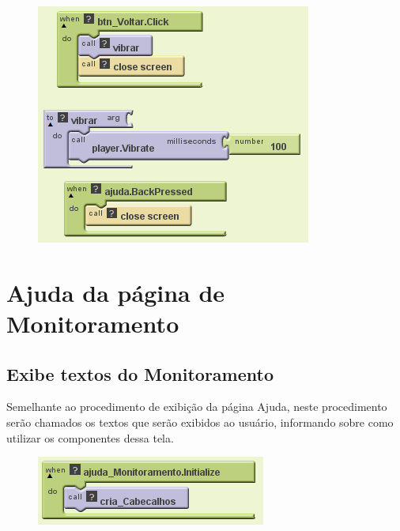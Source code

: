 \documentclass[portugues, brazil, a4paper,12pt]{article}
\begin{document}
\begin{figure}[H]
	\centering
	\includegraphics[scale=.8]{img/ajuda/saida.png}
	
\end{figure}




\newpage
\section{Ajuda da página de Monitoramento}
\subsection{Exibe textos do Monitoramento}
Semelhante ao procedimento de exibição da página Ajuda, neste procedimento serão chamados os textos que serão exibidos ao usuário, informando sobre como utilizar os componentes dessa tela.

\begin{figure}[H]
	\centering
	\includegraphics[scale=.8]{img/ajudaMonitoramento/inicio.png}
	
\end{figure}
\end{document}
